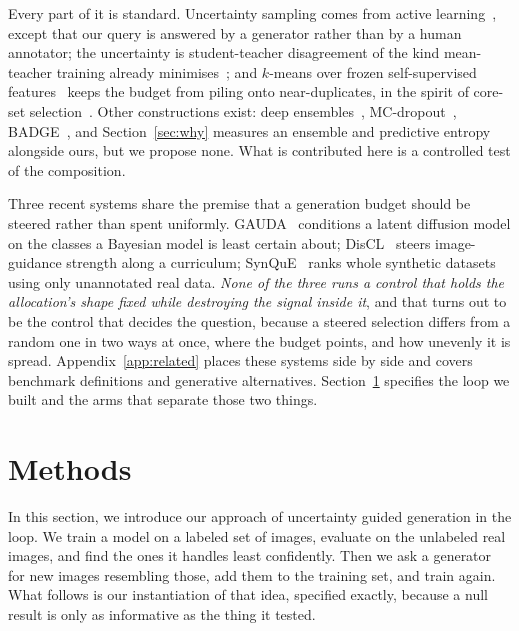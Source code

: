 \documentclass{article}
\begin{document}
Every part of it is standard. Uncertainty sampling comes from active learning~\citep{settles2009active}, except that our query is answered by a generator rather than by a human annotator; the uncertainty is student-teacher disagreement of the
kind mean-teacher training already minimises~\citep{tarvainen2017mean}; and $k$-means over frozen
self-supervised features~\citep{oquab2024dinov2,radford2021learning} keeps the budget from piling
onto near-duplicates, in the spirit of core-set selection~\citep{sener2018active}. Other
constructions exist: deep ensembles~\citep{lakshminarayanan2017simple},
MC-dropout~\citep{gal2016dropout}, BADGE~\citep{ash2020deep}, and Section~\ref{sec:why} measures
an ensemble and predictive entropy alongside ours, but we propose none. What is contributed here is a controlled test of the composition. 

Three recent systems share the premise that a generation budget should be steered rather than spent uniformly.
GAUDA~\citep{frisch2025gauda} conditions a latent diffusion model on the classes a Bayesian model is
least certain about; DisCL~\citep{liang2025discl} steers image-guidance strength along a curriculum;
SynQuE~\citep{chen2025synque} ranks whole synthetic datasets using only unannotated real data.
\textit{None of the three runs a control that holds the allocation's shape fixed while destroying
the signal inside it}, and that turns out to be the control that decides the question, because a
steered selection differs from a random one in two ways at once, where the budget points, and how
unevenly it is spread. Appendix~\ref{app:related} places these systems side by side and covers
benchmark definitions and generative alternatives. Section~\ref{sec:method} specifies the loop we
built and the arms that separate those two things.

\section{Methods}
\label{sec:method}
In this section, we introduce our approach of uncertainty guided generation in the loop. We train a model on a labeled set of images, evaluate on the unlabeled
real images, and find the ones it handles least confidently. Then we ask a generator for
new images resembling those, add them to the training set, and train again. What follows is our
instantiation of that idea, specified exactly, because a null result is only as informative as the
thing it tested.
\end{document}
